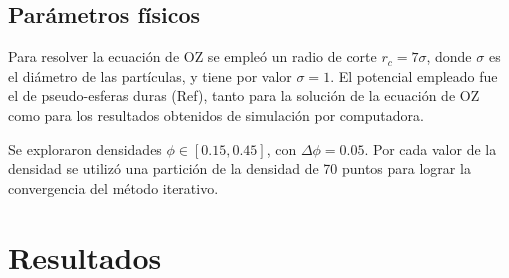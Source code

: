 \subsection{Parámetros físicos}

Para resolver la ecuación de OZ se empleó un radio de corte $r_c=7\sigma$, donde $\sigma$
es el diámetro de las partículas, y tiene por valor $\sigma=1$.
El potencial empleado fue el de pseudo-esferas duras (Ref), tanto para la solución de la ecuación
de OZ como para los resultados obtenidos de simulación por computadora.

Se exploraron densidades $\phi \in [\num{0.15}, \num{0.45}]$, con
$\Delta \phi = \num{0.05}$. Por cada valor
de la densidad se utilizó una partición de la densidad de 70 puntos para lograr la
convergencia del método iterativo.

\section{Resultados}

